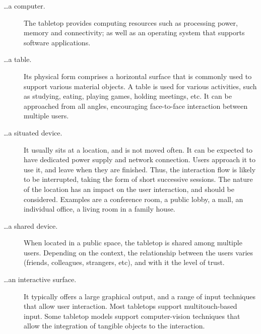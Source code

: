 \begin{description}

\item[\ldots a computer.]
The tabletop provides computing resources such as processing power, memory and connectivity; as well as an operating system that supports software applications.

\item[\ldots a table.] 
Its physical form comprises a horizontal surface that is commonly used to support various material objects.
A table is used for various activities, such as studying, eating, playing games, holding meetings, etc.
It can be approached from all angles, encouraging face-to-face interaction between multiple users.

\item[\ldots a situated device.] 
It usually sits at a location, and is not moved often.
It can be expected to have dedicated power supply and network connection.
Users approach it to use it, and leave when they are finished.
Thus, the interaction flow is likely to be interrupted, taking the form of short successive sessions.
The nature of the location has an impact on the user interaction, and should be considered.
Examples are a conference room, a public lobby, a mall, an individual office, a living room in a family house.

\item[\ldots a shared device.] 
When located in a public space, the tabletop is shared among multiple users.
Depending on the context, the relationship between the users varies (friends, colleagues, strangers, etc), and with it the level of trust.

\item[\ldots an interactive surface.] 
It typically offers a large graphical output, and a range of input techniques that allow user interaction.
Most tabletops support multitouch-based input.
Some tabletop models support computer-vision techniques that allow the integration of tangible objects to the interaction.

\end{description}

